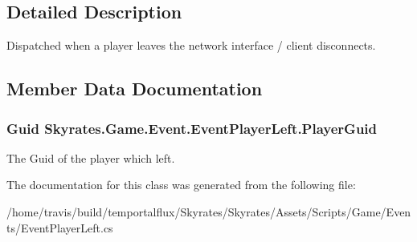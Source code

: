 \subsection{Detailed Description}
Dispatched when a player leaves the network interface / client disconnects. 



\subsection{Member Data Documentation}
\hypertarget{class_skyrates_1_1_game_1_1_event_1_1_event_player_left_a9681f9e891aeacdce99eddf68d74abd0}{
\subsubsection[{Player\-Guid}]{\setlength{\rightskip}{0pt plus 5cm}Guid Skyrates.\-Game.\-Event.\-Event\-Player\-Left.\-Player\-Guid}}\label{class_skyrates_1_1_game_1_1_event_1_1_event_player_left_a9681f9e891aeacdce99eddf68d74abd0}


The Guid of the player which left. 



The documentation for this class was generated from the following file\-:\begin{DoxyCompactItemize}
\item 
/home/travis/build/temportalflux/\-Skyrates/\-Skyrates/\-Assets/\-Scripts/\-Game/\-Events/Event\-Player\-Left.\-cs\end{DoxyCompactItemize}
